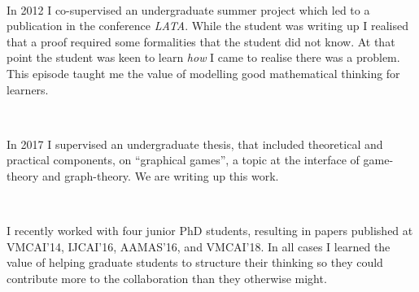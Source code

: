 \documentclass[10,a4paper,sans]{moderncv}
\begin{document}
\

In 2012 I co-supervised an undergraduate summer project which led to a publication in the conference {\em LATA}.  While the student was writing up I realised that a proof required some formalities that the student did not know. At that point the student was keen to learn {\em how} I came to realise there was a problem. This episode taught me the value of modelling good mathematical thinking for learners. %

\

In 2017 I supervised an undergraduate thesis, that included theoretical and practical components, on ``graphical games'', a topic at the interface of game-theory and graph-theory. We are writing up this work.

\

I recently worked with four junior PhD students, resulting in papers published at VMCAI'14, IJCAI'16, AAMAS'16, and VMCAI'18. In all cases I learned the value of 
helping graduate students to structure their thinking so they could contribute more to the collaboration than they otherwise might.

% 
% 
% 

% 

% 
% 
\end{document}
